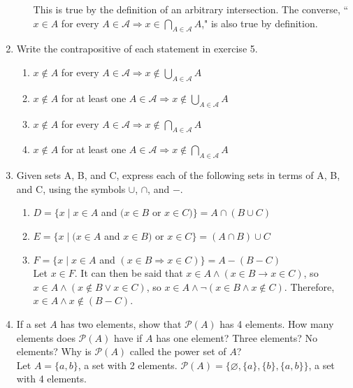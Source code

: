 \documentclass{article}
\begin{document}
\begin{enumerate}
\begin{enumerate}
                        This is true by the definition of an arbitrary intersection. The converse, “$x \in A$ for every $A \in \mathcal{A} \Rightarrow x \in \bigcap_{A \in \mathcal{A}} A$," is also true by definition.
            \end{enumerate}
      \item Write the contrapositive of each statement in exercise 5.
            \begin{enumerate}
                  \item $x \notin A$ for every $A \in \mathcal{A} \Rightarrow x \notin \bigcup_{A \in \mathcal{A}} A$
                  \item $x \notin A$ for at least one $A \in \mathcal{A} \Rightarrow x \notin \bigcup_{A \in \mathcal{A}} A$
                  \item $x \notin A$ for every $A \in \mathcal{A} \Rightarrow x \notin \bigcap_{A \in \mathcal{A}} A$
                  \item $x \notin A$ for at least one $A \in \mathcal{A} \Rightarrow x \notin \bigcap_{A \in \mathcal{A}} A$
            \end{enumerate}
      \item Given sets A, B, and C, express each of the following sets in terms of A, B, and C, using the symbols $\cup$, $\cap$, and $-$.
            \begin{enumerate}
                  \item $D = \{x \mid x \in A$ and $(x \in B$ or $x \in C)\} = A \cap (B \cup C)$
                  \item $E = \{x \mid (x \in A$ and $x \in B)$ or $x \in C\} = (A \cap B) \cup C$
                  \item $F = \{x \mid x \in A$ and $(x \in B \Rightarrow x \in C)\} = A - (B - C)$\\
                  Let $x \in F$. It can then be said that $x \in A \land (x \in B \to x \in C)$, so $x \in A \land (x \notin B \lor x \in C)$, so $x \in A \land \neg(x \in B \land x \notin C)$. Therefore, $x \in A \land x \notin (B - C)$.
            \end{enumerate}
      \item If a set $A$ has two elements, show that $\mathcal{P}(A)$ has 4 elements. How many elements does $\mathcal{P}(A)$ have if $A$ has one element? Three elements? No elements? Why is $\mathcal{P}(A)$ called the power set of $A$?\\
            Let $A = \{a, b\}$, a set with 2 elements. $\mathcal{P}(A) = \{\varnothing, \{a\}, \{b\}, \{a, b\}\}$, a set with 4 elements.\\

\end{enumerate}
\end{document}
